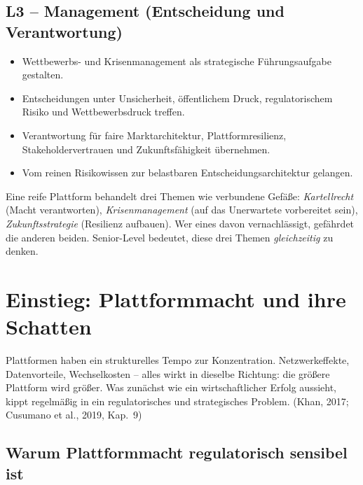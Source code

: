 \documentclass[11pt,a4paper,oneside]{article}
\newcommand{\quelle}[1]{{\footnotesize\color{lpGray}(#1)}}
\begin{document}
\subsection*{L3 -- Management (Entscheidung und Verantwortung)}
\begin{itemize}
  \item Wettbewerbs- und Krisenmanagement als strategische Führungsaufgabe gestalten.
  \item Entscheidungen unter Unsicherheit, öffentlichem Druck, regulatorischem Risiko und Wettbewerbsdruck treffen.
  \item Verantwortung für faire Marktarchitektur, Plattformresilienz, Stakeholdervertrauen und Zukunftsfähigkeit übernehmen.
  \item Vom reinen Risikowissen zur belastbaren Entscheidungsarchitektur gelangen.
\end{itemize}

\begin{merkbox}
Eine reife Plattform behandelt drei Themen wie verbundene Gefäße: \emph{Kartellrecht} (Macht verantworten), \emph{Krisenmanagement} (auf das Unerwartete vorbereitet sein), \emph{Zukunftsstrategie} (Resilienz aufbauen). Wer eines davon vernachlässigt, gefährdet die anderen beiden. Senior-Level bedeutet, diese drei Themen \emph{gleichzeitig} zu denken.
\end{merkbox}

\clearpage

\section{Einstieg: Plattformmacht und ihre Schatten}

Plattformen haben ein strukturelles Tempo zur Konzentration. Netzwerkeffekte, Datenvorteile, Wechselkosten -- alles wirkt in dieselbe Richtung: die größere Plattform wird größer. Was zunächst wie ein wirtschaftlicher Erfolg aussieht, kippt regelmäßig in ein regulatorisches und strategisches Problem. \quelle{Khan, 2017; Cusumano et al., 2019, Kap.~9}

\subsection{Warum Plattformmacht regulatorisch sensibel ist}
\end{document}
